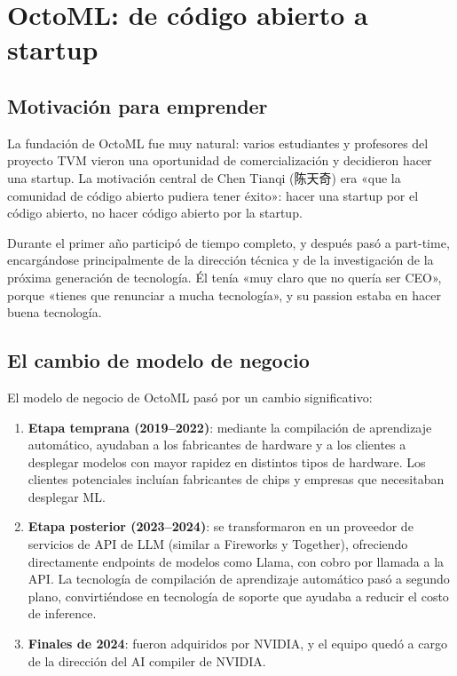 \documentclass[a4paper]{article}
\begin{document}
\section{OctoML: de código abierto a startup}

\subsection{Motivación para emprender}

La fundación de OctoML fue muy natural: varios estudiantes y profesores del proyecto TVM vieron una oportunidad de comercialización y decidieron hacer una startup. La motivación central de Chen Tianqi (陈天奇) era «que la comunidad de código abierto pudiera tener éxito»: hacer una startup por el código abierto, no hacer código abierto por la startup.

Durante el primer año participó de tiempo completo, y después pasó a part-time, encargándose principalmente de la dirección técnica y de la investigación de la próxima generación de tecnología. Él tenía «muy claro que no quería ser CEO», porque «tienes que renunciar a mucha tecnología», y su passion estaba en hacer buena tecnología.

\subsection{El cambio de modelo de negocio}

El modelo de negocio de OctoML pasó por un cambio significativo:

\begin{enumerate}
    \item \textbf{Etapa temprana (2019--2022)}: mediante la compilación de aprendizaje automático, ayudaban a los fabricantes de hardware y a los clientes a desplegar modelos con mayor rapidez en distintos tipos de hardware. Los clientes potenciales incluían fabricantes de chips y empresas que necesitaban desplegar ML.
    \item \textbf{Etapa posterior (2023--2024)}: se transformaron en un proveedor de servicios de API de LLM (similar a Fireworks y Together), ofreciendo directamente endpoints de modelos como Llama, con cobro por llamada a la API. La tecnología de compilación de aprendizaje automático pasó a segundo plano, convirtiéndose en tecnología de soporte que ayudaba a reducir el costo de inference.
    \item \textbf{Finales de 2024}: fueron adquiridos por NVIDIA, y el equipo quedó a cargo de la dirección del AI compiler de NVIDIA.
\end{enumerate}
\end{document}
